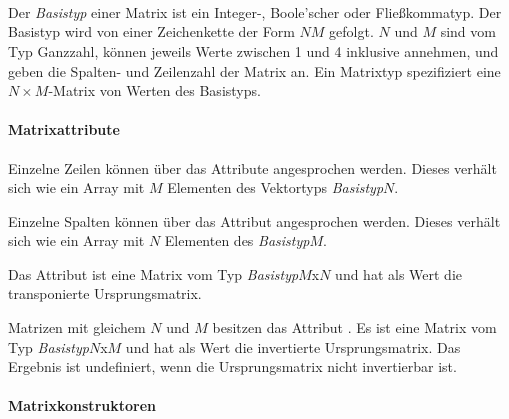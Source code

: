 \hspace*{1cm}\glq{}\grq \\
\hspace*{1cm}\glq{}\grq \\
\hspace*{1cm}\glq{}\grq \\
\hspace*{1cm}\glq{}\grq \\
\hspace*{1cm}\glq{}\grq \\
\hspace*{1cm}\glq{}\grq \\
\hspace*{1cm}\glq{}\grq \\
\hspace*{1cm}\glq{}\grq \\

Der \emph{Basistyp} einer Matrix ist ein Integer-, Boole'scher oder Fließkommatyp.
Der Basistyp wird von einer Zeichenkette der Form $N$$M$ gefolgt. $N$ und
$M$ sind vom Typ Ganzzahl, können jeweils Werte zwischen 1 und 4 inklusive annehmen,
und geben die Spalten- und Zeilenzahl
der Matrix an. Ein Matrixtyp spezifiziert eine  $N \times M$-Matrix von Werten des Basistyps.

\paragraph{Matrixattribute}\label{Matrixattribute}

Einzelne Zeilen können über das Attribute  angesprochen werden. Dieses
verhält sich wie ein Array mit $M$ Elementen des Vektortyps \emph{Basistyp}$N$.

Einzelne Spalten können über das Attribut  angesprochen werden. Dieses
verhält sich wie ein Array mit $N$ Elementen des \emph{Basistyp}$M$.

Das Attribut  ist eine Matrix vom Typ \emph{Basistyp}$M$x$N$
und hat als Wert die transponierte Ursprungsmatrix.

Matrizen mit gleichem $N$ und $M$ besitzen das Attribut .
Es ist eine Matrix vom Typ \emph{Basistyp}$N$x$M$ und hat als Wert die invertierte Ursprungsmatrix.
Das Ergebnis ist undefiniert, wenn die Ursprungsmatrix nicht invertierbar ist.

\paragraph{Matrixkonstruktoren}\label{Matrixkonstruktoren}

